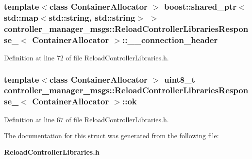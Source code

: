 \subsubsection[{\-\_\-\-\_\-connection\-\_\-header}]{\setlength{\rightskip}{0pt plus 5cm}template$<$class Container\-Allocator $>$ boost\-::shared\-\_\-ptr$<$std\-::map$<$std\-::string, std\-::string$>$ $>$ {\bf controller\-\_\-manager\-\_\-msgs\-::\-Reload\-Controller\-Libraries\-Response\-\_\-}$<$ \-Container\-Allocator $>$\-::{\bf \-\_\-\-\_\-connection\-\_\-header}}\label{structcontroller__manager__msgs_1_1ReloadControllerLibrariesResponse___a92f12080c7538c0609b604dd43241ff9}


\-Definition at line 72 of file \-Reload\-Controller\-Libraries.\-h.

\subsubsection[{ok}]{\setlength{\rightskip}{0pt plus 5cm}template$<$class Container\-Allocator $>$ uint8\-\_\-t {\bf controller\-\_\-manager\-\_\-msgs\-::\-Reload\-Controller\-Libraries\-Response\-\_\-}$<$ \-Container\-Allocator $>$\-::{\bf ok}}\label{structcontroller__manager__msgs_1_1ReloadControllerLibrariesResponse___a908a7817d7f250021510b18153f8c087}


\-Definition at line 67 of file \-Reload\-Controller\-Libraries.\-h.



\-The documentation for this struct was generated from the following file\-:\begin{DoxyCompactItemize}
\item 
{\bf \-Reload\-Controller\-Libraries.\-h}\end{DoxyCompactItemize}
